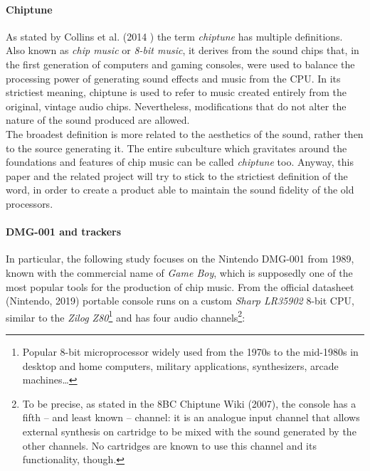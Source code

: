 \documentclass[]{article}
\begin{document}
        \paragraph{Chiptune}
        As stated by Collins et al. (2014 )\nocite{COLLINS2014} the term \emph{chiptune} has multiple 
        definitions. Also known as \emph{chip music} or \emph{8-bit music}, it derives from the sound chips that,
         in the first generation of computers and gaming consoles,
         were used to balance the processing power of generating sound effects and music from the
        CPU. In its strictiest meaning, chiptune is used to refer to music created entirely from the original, vintage audio 
        chips. Nevertheless, modifications that do not alter the nature of the sound produced are allowed.\\
        The broadest definition is more related to the aesthetics of the sound, rather then to the source
        generating it. The entire subculture which gravitates around the foundations and features of chip
        music can be called \emph{chiptune} too. Anyway, this paper and the related project will try to stick
        to the strictiest definition of the word, in order to create a product able to maintain the sound fidelity
        of the old processors.

        \paragraph{DMG-001 and trackers}
        In particular, the following study focuses on the Nintendo DMG-001 from 1989, known with the commercial 
        name of \emph{Game Boy}, which is supposedly one of the most popular tools for the production of chip music.
        From the official datasheet (Nintendo, 2019)\nocite{NINTENDO2019} portable console runs on a custom 
        \emph{Sharp LR35902} 8-bit CPU, similar to the \emph{Zilog Z80}\footnote{Popular 8-bit microprocessor widely used 
        from the 1970s to the mid-1980s in desktop and home computers, military applications, synthesizers, arcade machines\ldots} 
        and has four audio channels\footnote{To be precise, as stated in the 8BC Chiptune Wiki (2007)\nocite{8BCCHIPTUNE2007}, 
        the console has a fifth -- and least known -- channel: it is an analogue input channel that allows 
        external synthesis on cartridge to be mixed with the sound generated by the other channels. No cartridges 
        are known to use this channel and its functionality, though.}:\\[10pt]
        
\end{document}
